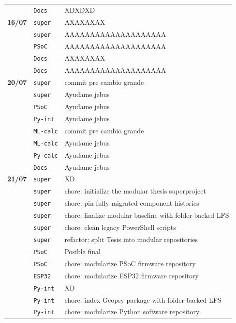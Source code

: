 \begin{longtable}{@{}p{1.7cm} p{1.5cm} p{12.2cm}@{}}
 & \texttt{\scriptsize Docs} & XDXDXD \\
\textbf{16/07} & \texttt{\scriptsize super} & AXAXAXAX \\
 & \texttt{\scriptsize super} & AAAAAAAAAAAAAAAAAAAA \\
 & \texttt{\scriptsize PSoC} & AAAAAAAAAAAAAAAAAAAA \\
 & \texttt{\scriptsize Docs} & AXAXAXAX \\
 & \texttt{\scriptsize Docs} & AAAAAAAAAAAAAAAAAAAA \\
\textbf{20/07} & \texttt{\scriptsize super} & commit pre cambio grande \\
 & \texttt{\scriptsize super} & Ayudame jebus \\
 & \texttt{\scriptsize PSoC} & Ayudame jebus \\
 & \texttt{\scriptsize Py-int} & Ayudame jebus \\
 & \texttt{\scriptsize ML-calc} & commit pre cambio grande \\
 & \texttt{\scriptsize ML-calc} & Ayudame jebus \\
 & \texttt{\scriptsize Py-calc} & Ayudame jebus \\
 & \texttt{\scriptsize Docs} & Ayudame jebus \\
\textbf{21/07} & \texttt{\scriptsize super} & XD \\
 & \texttt{\scriptsize super} & chore: initialize the modular thesis superproject \\
 & \texttt{\scriptsize super} & chore: pin fully migrated component histories \\
 & \texttt{\scriptsize super} & chore: finalize modular baseline with folder-backed LFS \\
 & \texttt{\scriptsize super} & chore: clean legacy PowerShell scripts \\
 & \texttt{\scriptsize super} & refactor: split Tesis into modular repositories \\
 & \texttt{\scriptsize PSoC} & Posible final \\
 & \texttt{\scriptsize PSoC} & chore: modularize PSoC firmware repository \\
 & \texttt{\scriptsize ESP32} & chore: modularize ESP32 firmware repository \\
 & \texttt{\scriptsize Py-int} & XD \\
 & \texttt{\scriptsize Py-int} & chore: index Geopsy package with folder-backed LFS \\
 & \texttt{\scriptsize Py-int} & chore: modularize Python software repository \\

\end{longtable}
